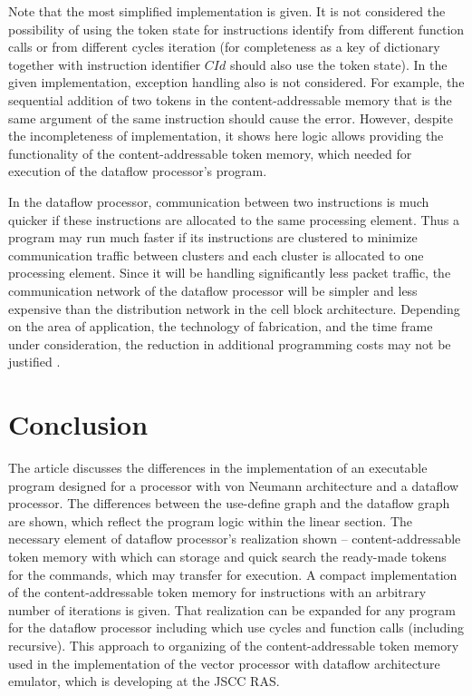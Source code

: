 \documentclass[
11pt,%
tightenlines,%
twoside,%
onecolumn,%
nofloats,%
nobibnotes,%
nofootinbib,%
superscriptaddress,%
noshowpacs,%
centertags]%
{revtex4}
\begin{document}
Note that the most simplified implementation is given.
It is not considered the possibility of using the token state for instructions identify from different function calls or from different cycles iteration (for completeness as a key of dictionary together with instruction identifier $CId$ should also use the token state).
In the given implementation, exception handling also is not considered.
For example, the sequential addition of two tokens in the content-addressable memory that is the same argument of the same instruction should cause the error.
However, despite the incompleteness of implementation, it shows here logic allows providing the functionality of the content-addressable token memory, which needed for execution of the dataflow processor’s program.

In the dataflow processor, communication between two instructions is much quicker if these instructions are allocated to the same processing element.
Thus a program may run much faster if its instructions are clustered to minimize communication traffic between clusters and each cluster is allocated to one processing element.
Since it will be handling significantly less packet traffic, the communication network of the dataflow processor will be simpler and less expensive than the distribution network in the cell block architecture.
Depending on the area of application, the technology of fabrication, and the time frame under consideration, the reduction in additional programming costs may not be justified \cite{Dennis}.

\section{Conclusion}

The article discusses the differences in the implementation of an executable program designed for a processor with von Neumann architecture and a dataflow processor.
The differences between the use-define graph and the dataflow graph are shown, which reflect the program logic within the linear section.
The necessary element of dataflow processor’s realization shown -- content-addressable token memory with which can storage and quick search the ready-made tokens for the commands, which may transfer for execution.
A compact implementation of the content-addressable token memory for instructions with an arbitrary number of iterations is given.
That realization can be expanded for any program for the dataflow processor including which use cycles and function calls (including recursive).
This approach to organizing of the content-addressable token memory used in the implementation of the vector processor with dataflow architecture emulator, which is developing at the JSCC RAS.
\end{document}
